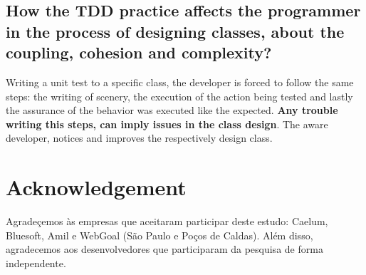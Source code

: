 \documentclass[conference]{IEEEtran}
\begin{document}
\subsection{How the TDD practice affects the programmer in the process of designing
classes, about the coupling, cohesion and complexity?}

Writing a unit test to a specific class, the developer is forced to follow
the same steps: the writing of scenery, the execution of the action being
tested and lastly the assurance of the behavior was executed like the
expected.
\textbf{Any trouble writing this steps, can imply issues in the class design}. 
The aware developer, notices and improves the respectively design class.


\section*{Acknowledgement}

Agradeçemos às empresas que aceitaram participar deste estudo: Caelum, Bluesoft,
Amil e WebGoal (São Paulo e Poços de Caldas). Além disso, agradecemos aos
desenvolvedores que participaram da pesquisa de forma independente.


\footnotesize{}

\end{document}
